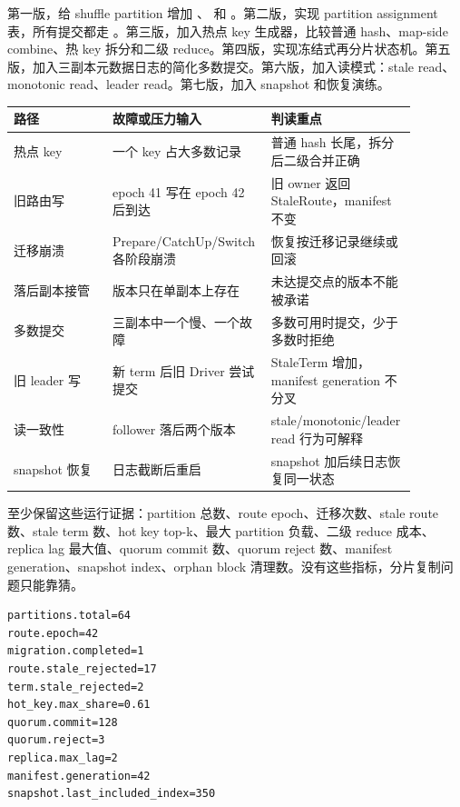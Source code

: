 第一版，给 shuffle partition 增加 、 和 。第二版，实现 partition assignment 表，所有提交都走 。第三版，加入热点 key 生成器，比较普通 hash、map-side combine、热 key 拆分和二级 reduce。第四版，实现冻结式再分片状态机。第五版，加入三副本元数据日志的简化多数提交。第六版，加入读模式：stale read、monotonic read、leader read。第七版，加入 snapshot 和恢复演练。

\begin{center}
\begin{tabular}{p{0.24\linewidth}p{0.34\linewidth}p{0.30\linewidth}}
\toprule
路径 & 故障或压力输入 & 判读重点 \\
\midrule
热点 key & 一个 key 占大多数记录 & 普通 hash 长尾，拆分后二级合并正确 \\
旧路由写 & epoch 41 写在 epoch 42 后到达 & 旧 owner 返回 StaleRoute，manifest 不变 \\
迁移崩溃 & Prepare/CatchUp/Switch 各阶段崩溃 & 恢复按迁移记录继续或回滚 \\
落后副本接管 & 版本只在单副本上存在 & 未达提交点的版本不能被承诺 \\
多数提交 & 三副本中一个慢、一个故障 & 多数可用时提交，少于多数时拒绝 \\
旧 leader 写 & 新 term 后旧 Driver 尝试提交 & StaleTerm 增加，manifest generation 不分叉 \\
读一致性 & follower 落后两个版本 & stale/monotonic/leader read 行为可解释 \\
snapshot 恢复 & 日志截断后重启 & snapshot 加后续日志恢复同一状态 \\
\bottomrule
\end{tabular}
\end{center}

至少保留这些运行证据：partition 总数、route epoch、迁移次数、stale route 数、stale term 数、hot key top-k、最大 partition 负载、二级 reduce 成本、replica lag 最大值、quorum commit 数、quorum reject 数、manifest generation、snapshot index、orphan block 清理数。没有这些指标，分片复制问题只能靠猜。

\begin{lstlisting}[numbers=none,caption={分片复制运行证据示例}]
partitions.total=64
route.epoch=42
migration.completed=1
route.stale_rejected=17
term.stale_rejected=2
hot_key.max_share=0.61
quorum.commit=128
quorum.reject=3
replica.max_lag=2
manifest.generation=42
snapshot.last_included_index=350
\end{lstlisting}

